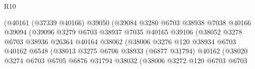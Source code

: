 \begin{lexlean}{R10}
\begin{coremodule}
                                      (@40161
                                        (@37339 @40166)
                                        @39050
                                        (@39084
                                          @3280
                                          @6703
                                          @38938
                                          @7038
                                          @40166
                                          @39094
                                          (@39096
                                            @3279
                                            @6703
                                            @38937
                                            @7035
                                            @40165
                                            @39106
                                            (@38052
                                              @3278
                                              @6703
                                              @38936
                                              @26364
                                              @40164
                                              @38062
                                              (@38006
                                                @3276
                                                @120
                                                @38934
                                                @6703
                                                @40162
                                                @6548
                                                (@38013
                                                  @3275
                                                  @6706
                                                  @38933
                                                  (@6877 @31794)
                                                  @40162
                                                  (@38020
                                                    @3274
                                                    @6703
                                                    @6705
                                                    @6876
                                                    @31794
                                                    @38032
                                                    (@38006
                                                      @3272
                                                      @120
                                                      @6703
                                                      @6703

\end{coremodule}
\end{lexlean}
